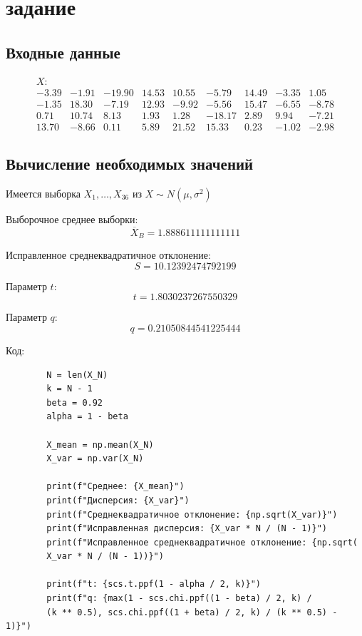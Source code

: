 \documentclass[a4paper,14pt]{extarticle}
\begin{document}
	\newpage

	\section{задание}

	\subsection{Входные данные}

	\begin{equation} \label{X_18_3}
		\begin{array}{ccccccccc}
			X: \\
			-3.39 & -1.91 & -19.90 & 14.53 & 10.55 & -5.79 & 14.49 & -3.35 & 1.05 \\
			-1.35 & 18.30 & -7.19 & 12.93 & -9.92 & -5.56 & 15.47 & -6.55 & -8.78 \\
			0.71 & 10.74 & 8.13 & 1.93 & 1.28 & -18.17 & 2.89 & 9.94 & -7.21 \\
			13.70 & -8.66 & 0.11 & 5.89 & 21.52 & 15.33 & 0.23 & -1.02 & -2.98
		\end{array}
	\end{equation}

	\subsection{Вычисление необходимых значений}

	Имеется выборка $X_1, \ldots, X_{36} \text{ из } X \sim N(\mu, \sigma^2)$ 

	Выборочное среднее выборки:
	\[\displaystyle
	\overline{X}_B = 1.888611111111111
	\]

	Исправленное среднеквадратичное отклонение:
	\[\displaystyle
	S = 10.12392474792199
	\]

	Параметр $t$:
	\[\displaystyle
	t = 1.8030237267550329
	\]

	Параметр $q$:
	\[\displaystyle
	q = 0.21050844541225444
	\]

	Код:
	\begin{verbatim}
		N = len(X_N)
		k = N - 1
		beta = 0.92
		alpha = 1 - beta

		X_mean = np.mean(X_N)
		X_var = np.var(X_N)

		print(f"Среднее: {X_mean}")
		print(f"Дисперсия: {X_var}")
		print(f"Среднеквадратичное отклонение: {np.sqrt(X_var)}")
		print(f"Исправленная дисперсия: {X_var * N / (N - 1)}")
		print(f"Исправленное среднеквадратичное отклонение: {np.sqrt(
		X_var * N / (N - 1))}")

		print(f"t: {scs.t.ppf(1 - alpha / 2, k)}")
		print(f"q: {max(1 - scs.chi.ppf((1 - beta) / 2, k) / 
		(k ** 0.5), scs.chi.ppf((1 + beta) / 2, k) / (k ** 0.5) - 1)}")
	\end{verbatim}
\end{document}
